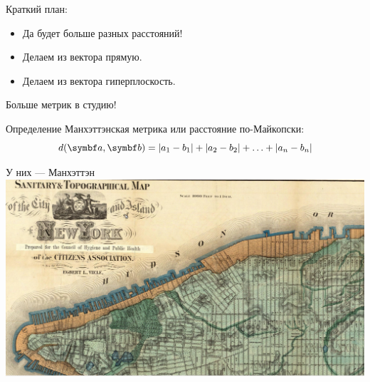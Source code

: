 
\begin{frame} %


\end{frame}


\begin{frame}{Краткий план:}

\begin{itemize}[<+->]
  \item Да будет больше разных расстояний!
  \item Делаем из вектора прямую.
  \item Делаем из вектора гиперплоскость.
\end{itemize}

\end{frame}


\begin{frame}{Больше метрик в студию!}

 \begin{block}{Определение} 
 \alert{Манхэттэнская метрика} или \alert{расстояние по-Майкопски}:
  \[
  d(\ba, \bb) = \abs{a_1 - b_1}  + \abs{a_2 - b_2} + \ldots + \abs{a_n - b_n}
  \]
 \end{block}

\end{frame}




\begin{frame}{У них — Манхэттэн}
\includegraphics[scale=0.5]{figures/video_010_manhattan.png}


\end{frame}



